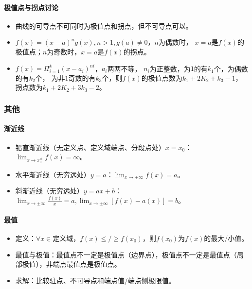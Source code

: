 \documentclass[
12pt, %
a4paper, 
oneside, %
headinclude,footinclude, %
]{scrartcl}
\begin{document}
\paragraph{极值点与拐点讨论}
\begin{itemize}
\item 曲线的可导点不可同时为极值点和拐点，但不可导点可以。
\item $ f(x) = (x - a)^n g(x), n > 1, g(a) \neq 0 $，$ n $为偶数时，
$ x = a $是$ f(x) $的极值点；$ n $为奇数时，$ x = a $是$ f(x) $的拐点。
\item $ f(x) = \Pi_{i = 1}^k (x - a_i)^{ni} $，$ a_i $两两不等，
$ n_i $为正整数，为$ 1 $的有$ k_1 $个，为偶数的有$ k_2 $个，
为非$ 1 $奇数的有$ k_3 $个，则$ f(x) $的极值点数为$ k_1 + 2K_2 + k_3 - 1 $，
拐点数为$ k_1 + 2K_2 + 3k_3 - 2 $。
\end{itemize}
\subsubsection{其他}
\paragraph{渐近线}
\begin{itemize}
\item 铅直渐近线（无定义点、定义域端点、分段点处）$ x = x_0 $：$ \lim_{x \to x_0^{\pm}} f(x) = \infty $。
\item 水平渐近线（无穷远处）$ y = a $：$ \lim_{x \to \pm \infty} f(x) = a $。
\item 斜渐近线（无穷远处）$ y = ax + b $：$ \lim_{x \to \pm \infty} \frac{f(x)}{x} = a, \lim_{x \to \pm \infty} [f(x) - a(x)] = b $。
\end{itemize}
\paragraph{最值}
\begin{itemize}
\item 定义：$ \forall x \in $定义域，$ f(x) \leq / \geq f(x_0) $，则$ f(x_0) $为$ f(x) $的最大/小值。
\item 最值与极值：最值点不一定是极值点（边界点），极值点不一定是最值点（局部极值），非端点最值点是极值点。
\item 求解：比较驻点、不可导点和端点值/端点侧极限值。
\end{itemize}
\end{document}
